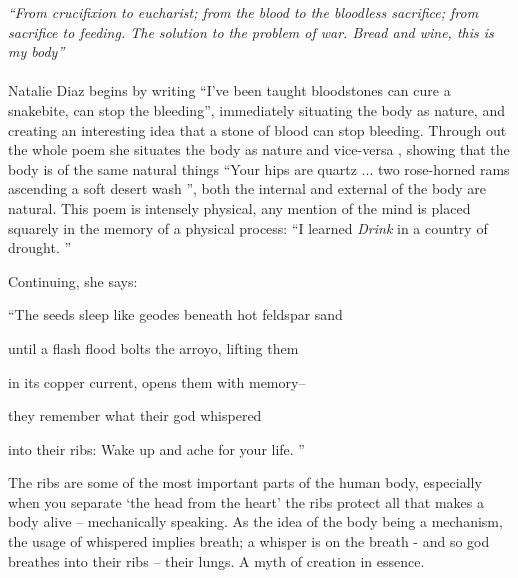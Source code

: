 
\textit{``From crucifixion to eucharist; from the blood to the bloodless sacrifice; from sacrifice to feeding. The solution to the problem of war. Bread and wine, this is my body''}
\paragraph{}
 Natalie Diaz begins by writing ``I’ve been taught bloodstones can cure a snakebite,
can stop the bleeding'', immediately situating the body as nature, and creating an interesting idea that a stone of blood can stop bleeding. Through out the whole poem she situates the body as nature and vice-versa , showing that the body is of the same natural things ``Your hips are quartz ... two rose-horned rams ascending a soft desert wash '', both the internal and external of the body are natural. This poem is intensely physical, any mention of the mind is placed squarely in the memory of a physical process: ``I learned  \textit{Drink} in a country of drought. '' 

Continuing, she says:

``The seeds sleep like geodes beneath hot feldspar sand

until a flash flood bolts the arroyo, lifting them

in its copper current, opens them with memory–

they remember what their god whispered

into their ribs: Wake up and ache for your life. ''

The ribs are some of the most important parts of the human body, especially when you separate `the head from the heart' the ribs protect all that makes a body alive -- mechanically speaking. As the idea of the body being a mechanism, the usage of whispered implies breath; a whisper is on the breath - and so god breathes into their ribs -- their lungs. A myth of creation in essence. 
